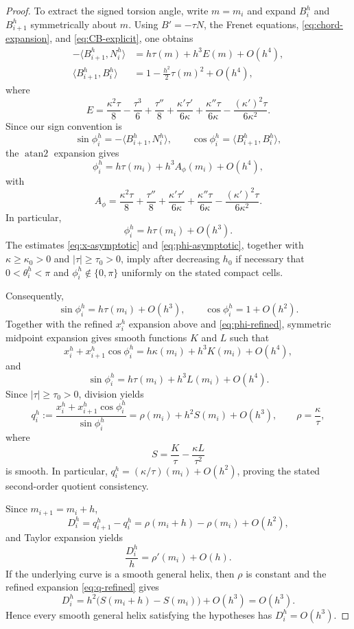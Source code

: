 \documentclass[10pt,a4paper]{amsart}
\begin{document}
\begin{proof}
To extract the signed torsion angle, write \(m=m_i\) and expand
\(B_i^h\) and \(B_{i+1}^h\) symmetrically about \(m\).  Using
\(B'=-\tau N\), the Frenet equations, \eqref{eq:chord-expansion},
and \eqref{eq:CB-explicit}, one obtains
\begin{align}
-\bigl\langle B_{i+1}^h,N_i^h\bigr\rangle
&=
h\tau(m)+h^3E(m)+O(h^4),
\label{eq:sinphi-expanded}\\
\bigl\langle B_{i+1}^h,B_i^h\bigr\rangle
&=
1-\frac{h^2}{2}\tau(m)^2+O(h^4),
\label{eq:cosphi-expanded}
\end{align}
where
\[
E=
\frac{\kappa^2\tau}{8}-\frac{\tau^3}{6}
+\frac{\tau''}{8}
+\frac{\kappa'\tau'}{6\kappa}
+\frac{\kappa''\tau}{6\kappa}
-\frac{(\kappa')^2\tau}{6\kappa^2}.
\]
Since our sign convention is
\[
\sin\phi_i^h=-\langle B_{i+1}^h,N_i^h\rangle,
\qquad
\cos\phi_i^h=\langle B_{i+1}^h,B_i^h\rangle,
\]
the \(\operatorname{atan2}\) expansion gives
\begin{equation}
\phi_i^h
=
h\tau(m_i)+h^3A_\phi(m_i)+O(h^4),
\label{eq:phi-refined}
\end{equation}
with
\[
A_\phi=
\frac{\kappa^2\tau}{8}
+\frac{\tau''}{8}
+\frac{\kappa'\tau'}{6\kappa}
+\frac{\kappa''\tau}{6\kappa}
-\frac{(\kappa')^2\tau}{6\kappa^2}.
\]
In particular,
\begin{equation}
\phi_i^h=h\tau(m_i)+O(h^3).
\label{eq:phi-asymptotic}
\end{equation}
The estimates \eqref{eq:x-asymptotic} and \eqref{eq:phi-asymptotic}, together with $\kappa\ge\kappa_0>0$ and $|\tau|\ge\tau_0>0$, imply after decreasing $h_0$ if necessary that $0<\theta_i^h<\pi$ and $\phi_i^h\notin\{0,\pi\}$ uniformly on the stated compact cells.

Consequently,
\[
\sin\phi_i^h=h\tau(m_i)+O(h^3),
\qquad
\cos\phi_i^h=1+O(h^2).
\]
Together with the refined $x_i^h$ expansion above and \eqref{eq:phi-refined}, symmetric midpoint expansion gives smooth functions $K$ and $L$ such that
\[
x_i^h+x_{i+1}^h\cos\phi_i^h
=
h\kappa(m_i)+h^3K(m_i)+O(h^4),
\]
and
\[
\sin\phi_i^h
=
h\tau(m_i)+h^3L(m_i)+O(h^4).
\]
Since \(|\tau|\ge\tau_0>0\), division yields
\begin{equation}
q_i^h:=
\frac{x_i^h+x_{i+1}^h\cos\phi_i^h}{\sin\phi_i^h}
=
\rho(m_i)+h^2S(m_i)+O(h^3),
\qquad
\rho=\frac{\kappa}{\tau},
\label{eq:q-refined}
\end{equation}
where
\[
S=\frac{K}{\tau}-\frac{\kappa L}{\tau^2}
\]
is smooth. In particular, $q_i^h=(\kappa/\tau)(m_i)+O(h^2)$, proving the stated second-order quotient consistency.

Since $m_{i+1}=m_i+h$,
\[
D_i^h=q_{i+1}^h-q_i^h
=\rho(m_i+h)-\rho(m_i)+O(h^2),
\]
and Taylor expansion yields
\[
\frac{D_i^h}{h}=\rho'(m_i)+O(h).
\]
If the underlying curve is a smooth general helix, then $\rho$ is constant and the refined expansion \eqref{eq:q-refined} gives
\[
D_i^h
=h^2\bigl(S(m_i+h)-S(m_i)\bigr)+O(h^3)
=O(h^3).
\]
Hence every smooth general helix satisfying the hypotheses has $D_i^h=O(h^3)$.
\end{proof}
\end{document}
